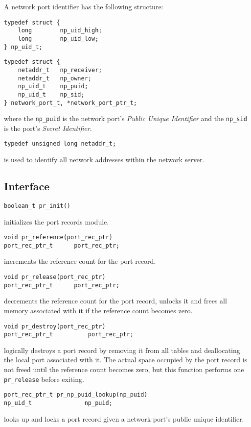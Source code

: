 A network port identifier has the following structure:
\begin{verbatim}
typedef struct {
    long        np_uid_high;
    long        np_uid_low;
} np_uid_t;
\end{verbatim}
\begin{verbatim}
typedef struct {
    netaddr_t   np_receiver;
    netaddr_t   np_owner;
    np_uid_t    np_puid;
    np_uid_t    np_sid;
} network_port_t, *network_port_ptr_t;
\end{verbatim}
where the \verb"np_puid" is the network port's {\it Public Unique
Identifier} and the \verb"np_sid" is the port's {\it Secret Identifier\/}.

\begin{verbatim}
typedef unsigned long netaddr_t;
\end{verbatim}
is used to identify all network addresses within the network server.


\subsection{Interface}
\begin{verbatim}
boolean_t pr_init()
\end{verbatim}
initializes the port records module.

\begin{verbatim}
void pr_reference(port_rec_ptr)
port_rec_ptr_t		port_rec_ptr;
\end{verbatim}
increments the reference count for the port record.

\begin{verbatim}
void pr_release(port_rec_ptr)
port_rec_ptr_t		port_rec_ptr;
\end{verbatim}
decrements the reference count for the port record, unlocks it and
frees all memory associated with it if the reference count becomes zero.

\begin{verbatim}
void pr_destroy(port_rec_ptr)
port_rec_ptr_t          port_rec_ptr;
\end{verbatim}
logically destroys a port record by removing it from all tables and
deallocating the local port associated with it. The actual space
occupied by the port record is not freed until the reference count
becomes zero, but this function performs one \verb"pr_release" before exiting.

\begin{verbatim}
port_rec_ptr_t pr_np_puid_lookup(np_puid)
np_uid_t               np_puid;
\end{verbatim}
looks up and locks a port record given a network port's public unique
identifier.				

